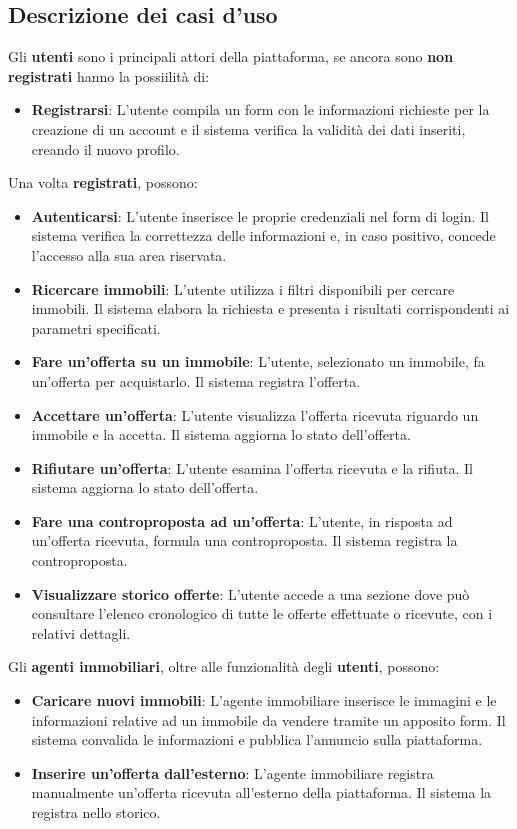 \documentclass{book}
\begin{document}
\subsection{Descrizione dei casi d'uso}
Gli \textbf{utenti} sono i principali attori della piattaforma, se ancora sono \textbf{non registrati} hanno la possiilità di:
\begin{itemize}
    \item \textbf{Registrarsi}: L'utente compila un form con le informazioni richieste per la creazione di un account e il sistema verifica la validità dei dati inseriti, creando il nuovo profilo.
\end{itemize}
Una volta \textbf{registrati}, possono:
\begin{itemize}
    \item \textbf{Autenticarsi}: L'utente inserisce le proprie credenziali nel form di login. Il sistema verifica la correttezza delle informazioni e, in caso positivo, concede l'accesso alla sua area riservata.
    \item \textbf{Ricercare immobili}: L'utente utilizza i filtri disponibili per cercare immobili. Il sistema elabora la richiesta e presenta i risultati corrispondenti ai parametri specificati.
    \item \textbf{Fare un'offerta su un immobile}: L'utente, selezionato un immobile, fa un'offerta per acquistarlo. Il sistema registra l'offerta.
    \item \textbf{Accettare un'offerta}: L'utente visualizza l'offerta ricevuta riguardo un immobile e la accetta. Il sistema aggiorna lo stato dell'offerta.
    \item \textbf{Rifiutare un'offerta}: L'utente esamina l'offerta ricevuta e la rifiuta. Il sistema aggiorna lo stato dell'offerta.
    \item \textbf{Fare una controproposta ad un'offerta}: L'utente, in risposta ad un'offerta ricevuta, formula una controproposta. Il sistema registra la controproposta.
    \item \textbf{Visualizzare storico offerte}: L'utente accede a una sezione dove può consultare l'elenco cronologico di tutte le offerte effettuate o ricevute, con i relativi dettagli.
\end{itemize}
Gli \textbf{agenti immobiliari}, oltre alle funzionalità degli \textbf{utenti}, possono:
\begin{itemize}
    \item \textbf{Caricare nuovi immobili}: L'agente immobiliare inserisce le immagini e le informazioni relative ad un immobile da vendere tramite un apposito form. Il sistema convalida le informazioni e pubblica l'annuncio sulla piattaforma.
    \item \textbf{Inserire un'offerta dall'esterno}: L'agente immobiliare registra manualmente un'offerta ricevuta all'esterno della piattaforma. Il sistema la registra nello storico.
\end{itemize}
\end{document}
